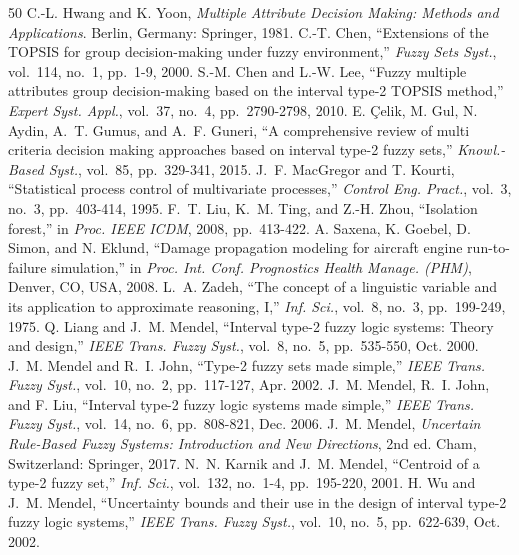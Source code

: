 \documentclass[journal,10pt,twocolumn]{IEEEtran}
\begin{document}
\begin{thebibliography}{50}
C.-L. Hwang and K. Yoon, \emph{Multiple Attribute Decision Making: Methods and Applications}. Berlin, Germany: Springer, 1981.
C.-T. Chen, ``Extensions of the TOPSIS for group decision-making under fuzzy environment,'' \emph{Fuzzy Sets Syst.}, vol.\ 114, no.\ 1, pp.\ 1-9, 2000.
S.-M. Chen and L.-W. Lee, ``Fuzzy multiple attributes group decision-making based on the interval type-2 TOPSIS method,'' \emph{Expert Syst. Appl.}, vol.\ 37, no.\ 4, pp.\ 2790-2798, 2010.
E. \c{C}elik, M. Gul, N. Aydin, A.~T. Gumus, and A.~F. Guneri, ``A comprehensive review of multi criteria decision making approaches based on interval type-2 fuzzy sets,'' \emph{Knowl.-Based Syst.}, vol.\ 85, pp.\ 329-341, 2015.
J.~F. MacGregor and T. Kourti, ``Statistical process control of multivariate processes,'' \emph{Control Eng. Pract.}, vol.\ 3, no.\ 3, pp.\ 403-414, 1995.
F.~T. Liu, K.~M. Ting, and Z.-H. Zhou, ``Isolation forest,'' in \emph{Proc. IEEE ICDM}, 2008, pp.\ 413-422.
A. Saxena, K. Goebel, D. Simon, and N. Eklund, ``Damage propagation modeling for aircraft engine run-to-failure simulation,'' in \emph{Proc. Int. Conf. Prognostics Health Manage. (PHM)}, Denver, CO, USA, 2008.
L.~A. Zadeh, ``The concept of a linguistic variable and its application to approximate reasoning, I,'' \emph{Inf. Sci.}, vol.\ 8, no.\ 3, pp.\ 199-249, 1975.
Q. Liang and J.~M. Mendel, ``Interval type-2 fuzzy logic systems: Theory and design,'' \emph{IEEE Trans. Fuzzy Syst.}, vol.\ 8, no.\ 5, pp.\ 535-550, Oct. 2000.
J.~M. Mendel and R.~I. John, ``Type-2 fuzzy sets made simple,'' \emph{IEEE Trans. Fuzzy Syst.}, vol.\ 10, no.\ 2, pp.\ 117-127, Apr. 2002.
J.~M. Mendel, R.~I. John, and F. Liu, ``Interval type-2 fuzzy logic systems made simple,'' \emph{IEEE Trans. Fuzzy Syst.}, vol.\ 14, no.\ 6, pp.\ 808-821, Dec. 2006.
J.~M. Mendel, \emph{Uncertain Rule-Based Fuzzy Systems: Introduction and New Directions}, 2nd ed. Cham, Switzerland: Springer, 2017.
N.~N. Karnik and J.~M. Mendel, ``Centroid of a type-2 fuzzy set,'' \emph{Inf. Sci.}, vol.\ 132, no.\ 1-4, pp.\ 195-220, 2001.
H. Wu and J.~M. Mendel, ``Uncertainty bounds and their use in the design of interval type-2 fuzzy logic systems,'' \emph{IEEE Trans. Fuzzy Syst.}, vol.\ 10, no.\ 5, pp.\ 622-639, Oct. 2002.

\end{thebibliography}
\end{document}
